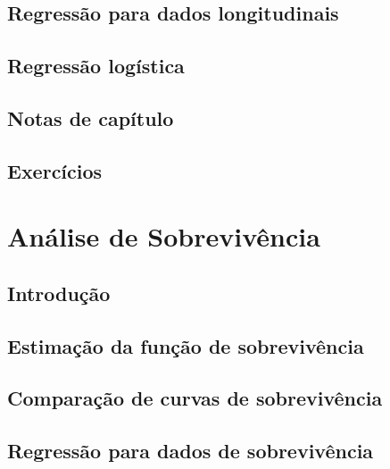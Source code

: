 \documentclass[
]{latex/krantz}
\theoremstyle{definition}
\theoremstyle{definition}
\theoremstyle{definition}
\theoremstyle{definition}
\theoremstyle{remark}
\begin{document}
\hypertarget{regressuxe3o-para-dados-longitudinais}{%
\section{Regressão para dados longitudinais}\label{regressuxe3o-para-dados-longitudinais}}

\hypertarget{regressuxe3o-loguxedstica}{%
\section{Regressão logística}\label{regressuxe3o-loguxedstica}}

\hypertarget{notas-de-capuxedtulo-4}{%
\section{Notas de capítulo}\label{notas-de-capuxedtulo-4}}

\hypertarget{exercuxedcios-4}{%
\section{Exercícios}\label{exercuxedcios-4}}

\hypertarget{anuxe1lise-de-sobrevivuxeancia}{%
\chapter{Análise de Sobrevivência}\label{anuxe1lise-de-sobrevivuxeancia}}

\hypertarget{introduuxe7uxe3o-5}{%
\section{Introdução}\label{introduuxe7uxe3o-5}}

\hypertarget{estimauxe7uxe3o-da-funuxe7uxe3o-de-sobrevivuxeancia}{%
\section{Estimação da função de sobrevivência}\label{estimauxe7uxe3o-da-funuxe7uxe3o-de-sobrevivuxeancia}}

\hypertarget{comparauxe7uxe3o-de-curvas-de-sobrevivuxeancia}{%
\section{Comparação de curvas de sobrevivência}\label{comparauxe7uxe3o-de-curvas-de-sobrevivuxeancia}}

\hypertarget{regressuxe3o-para-dados-de-sobrevivuxeancia}{%
\section{Regressão para dados de sobrevivência}\label{regressuxe3o-para-dados-de-sobrevivuxeancia}}
\end{document}
